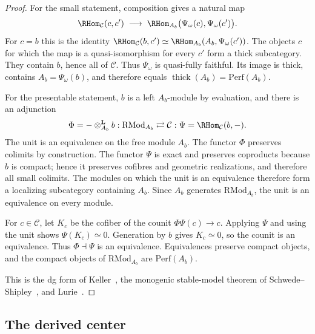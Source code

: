 \begin{proof}
For the small statement, composition gives a natural map
\[
 \RHom_{\mathcal C}(c,c')
\;\longrightarrow\;
 \RHom_{A_b}\bigl(\Psi_\omega(c),\Psi_\omega(c')\bigr).
\]
For $c=b$ this is the identity
$\RHom_{\mathcal C}(b,c')\simeq
\RHom_{A_b}(A_b,\Psi_\omega(c'))$.  The objects $c$ for which the
map is a quasi-isomorphism for every $c'$ form a thick subcategory.
They contain $b$, hence all of $\mathcal C$.  Thus $\Psi_\omega$ is
quasi-fully faithful.  Its image is thick, contains
$A_b=\Psi_\omega(b)$, and therefore equals
$\operatorname{thick}(A_b)=\mathrm{Perf}(A_b)$.

For the presentable statement, $b$ is a left $A_b$-module by
evaluation, and there is an adjunction
\[
 \Phi=-\otimes_{A_b}^{\mathbf L}b:
 \mathrm{RMod}_{A_b}\rightleftarrows\mathcal C:
 \Psi=\RHom_{\mathcal C}(b,-).
\]
The unit is an equivalence on the free module $A_b$.  The functor
$\Phi$ preserves colimits by construction.  The functor $\Psi$ is
exact and preserves coproducts because $b$ is compact; hence it
preserves cofibres and geometric realizations, and therefore all small
colimits.  The modules on which the unit is an
equivalence therefore form a localizing subcategory containing
$A_b$.  Since $A_b$ generates $\mathrm{RMod}_{A_b}$, the unit is an
equivalence on every module.

For $c\in\mathcal C$, let $K_c$ be the cofiber of the counit
$\Phi\Psi(c)\to c$.  Applying $\Psi$ and using the unit shows
$\Psi(K_c)\simeq0$.  Generation by $b$ gives $K_c\simeq0$, so the
counit is an equivalence.  Thus $\Phi\dashv\Psi$ is an equivalence.
Equivalences preserve compact objects, and the compact objects of
$\mathrm{RMod}_{A_b}$ are $\mathrm{Perf}(A_b)$.

This is the dg form of Keller~\cite[\S4]{Keller06}, the monogenic
stable-model theorem of Schwede--Shipley~\cite[Theorem~3.1.1]{SS03},
and Lurie~\cite[Theorem~7.1.2.1 and Remark~7.1.2.3]{HA}.
\end{proof}

\subsection{The derived center}


